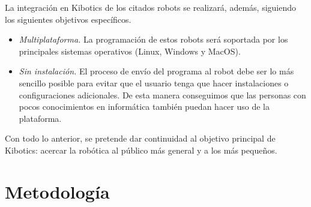 \documentclass{report}
\begin{document}
La integración en Kibotics de los citados robots se realizará, además, siguiendo los siguientes objetivos específicos.
\begin{itemize}
	\item \textit{Multiplataforma.} La programación de estos robots será soportada por los principales sistemas operativos (Linux, Windows y MacOS).
	\item \textit{Sin instalación.} El proceso de envío del programa al robot debe ser lo más sencillo posible para evitar que el usuario tenga que hacer instalaciones o configuraciones adicionales. De esta manera conseguimos que las personas con pocos conocimientos en informática también puedan hacer uso de la plataforma.
\end{itemize}
Con todo lo anterior, se pretende dar continuidad al objetivo principal de Kibotics: acercar la robótica al público más general y a los más pequeños.

\section{Metodología}
\end{document}
